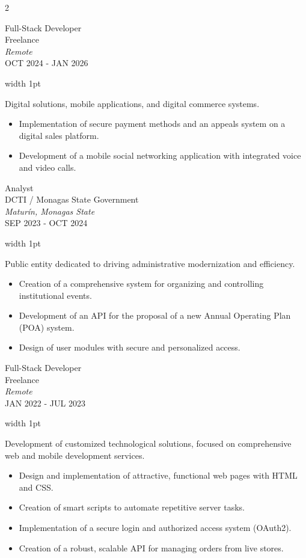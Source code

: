 \documentclass[9pt, a4paper]{article}
\newcommand{\CVExpMeta}[4]{
    {\noindent
    {\PlexMedium\color{CVPrimary} #1} \\
    {\PlexSans #2} \\
    {\PlexLight\itshape #3} \\
    {\PlexExtraLight #4}}
    \vspace{0.85cm}
}
\newcommand{\CVExpBody}[1]{
    \noindent
    \textcolor{CVLine}{\vrule width 1pt} \hspace{1cm}
    \begin{minipage}[t]{0.92\linewidth}
        \raggedright {\DMSansLight #1}
    \end{minipage}
    \vspace{0.8cm}
}
\begin{document}
\setlength{\columnsep}{1.6cm}
\begin{paracol}{2}

\CVExpMeta{Full-Stack Developer}
{Freelance}
{Remote}
{OCT 2024 - JAN 2026}
\switchcolumn
\CVExpBody{
Digital solutions, mobile applications, and digital commerce systems.
\begin{itemize}[label=\textcolor{CVBullet}{–}, leftmargin=0.5cm, topsep=0.4cm, itemsep=0.15cm]
    \item Implementation of secure payment methods and an appeals system on a digital sales platform.
    \item Development of a mobile social networking application with integrated voice and video calls.
\end{itemize}
}
\switchcolumn*

\CVExpMeta{Analyst}
{DCTI / Monagas State Government}
{Maturín, Monagas State}
{SEP 2023 - OCT 2024}
\switchcolumn
\CVExpBody{
Public entity dedicated to driving administrative modernization and efficiency.
\begin{itemize}[label=\textcolor{CVBullet}{–}, leftmargin=0.5cm, topsep=0.4cm, itemsep=0.15cm]
    \item Creation of a comprehensive system for organizing and controlling institutional events.
    \item Development of an API for the proposal of a new Annual Operating Plan (POA) system.
    \item Design of user modules with secure and personalized access.
\end{itemize}
}
\switchcolumn*

\CVExpMeta{Full-Stack Developer}
{Freelance}
{Remote}
{JAN 2022 - JUL 2023}
\switchcolumn
\CVExpBody{
Development of customized technological solutions, focused on comprehensive web and mobile development services.
\begin{itemize}[label=\textcolor{CVBullet}{–}, leftmargin=0.5cm, topsep=0.4cm, itemsep=0.15cm]
    \item Design and implementation of attractive, functional web pages with HTML and CSS.
    \item Creation of smart scripts to automate repetitive server tasks.
    \item Implementation of a secure login and authorized access system (OAuth2).
    \item Creation of a robust, scalable API for managing orders from live stores.
\end{itemize}
}

\end{paracol}
\end{document}
